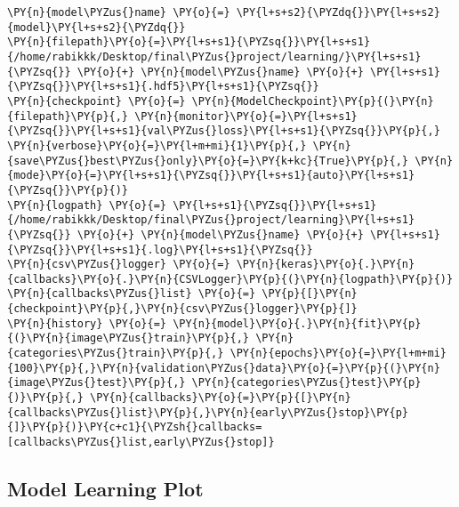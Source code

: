 \begin{tcolorbox}[breakable, size=fbox, boxrule=1pt, pad at break*=1mm,colback=cellbackground, colframe=cellborder]
\begin{Verbatim}[commandchars=\\\{\}]
\PY{n}{model\PYZus{}name} \PY{o}{=} \PY{l+s+s2}{\PYZdq{}}\PY{l+s+s2}{model}\PY{l+s+s2}{\PYZdq{}}
\PY{n}{filepath}\PY{o}{=}\PY{l+s+s1}{\PYZsq{}}\PY{l+s+s1}{/home/rabikkk/Desktop/final\PYZus{}project/learning/}\PY{l+s+s1}{\PYZsq{}} \PY{o}{+} \PY{n}{model\PYZus{}name} \PY{o}{+} \PY{l+s+s1}{\PYZsq{}}\PY{l+s+s1}{.hdf5}\PY{l+s+s1}{\PYZsq{}}
\PY{n}{checkpoint} \PY{o}{=} \PY{n}{ModelCheckpoint}\PY{p}{(}\PY{n}{filepath}\PY{p}{,} \PY{n}{monitor}\PY{o}{=}\PY{l+s+s1}{\PYZsq{}}\PY{l+s+s1}{val\PYZus{}loss}\PY{l+s+s1}{\PYZsq{}}\PY{p}{,} \PY{n}{verbose}\PY{o}{=}\PY{l+m+mi}{1}\PY{p}{,} \PY{n}{save\PYZus{}best\PYZus{}only}\PY{o}{=}\PY{k+kc}{True}\PY{p}{,} \PY{n}{mode}\PY{o}{=}\PY{l+s+s1}{\PYZsq{}}\PY{l+s+s1}{auto}\PY{l+s+s1}{\PYZsq{}}\PY{p}{)}
\PY{n}{logpath} \PY{o}{=} \PY{l+s+s1}{\PYZsq{}}\PY{l+s+s1}{/home/rabikkk/Desktop/final\PYZus{}project/learning}\PY{l+s+s1}{\PYZsq{}} \PY{o}{+} \PY{n}{model\PYZus{}name} \PY{o}{+} \PY{l+s+s1}{\PYZsq{}}\PY{l+s+s1}{.log}\PY{l+s+s1}{\PYZsq{}}
\PY{n}{csv\PYZus{}logger} \PY{o}{=} \PY{n}{keras}\PY{o}{.}\PY{n}{callbacks}\PY{o}{.}\PY{n}{CSVLogger}\PY{p}{(}\PY{n}{logpath}\PY{p}{)}
\PY{n}{callbacks\PYZus{}list} \PY{o}{=} \PY{p}{[}\PY{n}{checkpoint}\PY{p}{,}\PY{n}{csv\PYZus{}logger}\PY{p}{]}
\PY{n}{history} \PY{o}{=} \PY{n}{model}\PY{o}{.}\PY{n}{fit}\PY{p}{(}\PY{n}{image\PYZus{}train}\PY{p}{,} \PY{n}{categories\PYZus{}train}\PY{p}{,} \PY{n}{epochs}\PY{o}{=}\PY{l+m+mi}{100}\PY{p}{,}\PY{n}{validation\PYZus{}data}\PY{o}{=}\PY{p}{(}\PY{n}{image\PYZus{}test}\PY{p}{,} \PY{n}{categories\PYZus{}test}\PY{p}{)}\PY{p}{,} \PY{n}{callbacks}\PY{o}{=}\PY{p}{[}\PY{n}{callbacks\PYZus{}list}\PY{p}{,}\PY{n}{early\PYZus{}stop}\PY{p}{]}\PY{p}{)}\PY{c+c1}{\PYZsh{}callbacks=[callbacks\PYZus{}list,early\PYZus{}stop]}
\end{Verbatim}
\end{tcolorbox}

\subsection{    Model Learning Plot}

